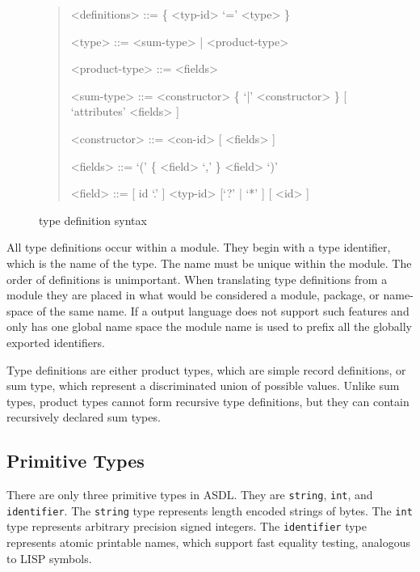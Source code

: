 \begin{figure}[t]
  \begin{quote}
    \begin{grammar}
      <definitions>  ::=  \{ <typ-id> `=' <type> \}

      <type>         ::= <sum-type> | <product-type>

      <product-type> ::= <fields>

      <sum-type>     ::= <constructor> \{ `|' <constructor> \} [ `attributes' <fields> ]

      <constructor>  ::= <con-id> [ <fields> ]

      <fields>       ::= `(' \{ <field>  `,' \} <field> `)'

      <field>        ::= [ id `.' ] <typ-id> [`?' | `*' ]  [ <id> ]
    \end{grammar}
  \end{quote}
  \caption{\asdl{} type definition syntax}
  \label{fig:type-syntax}
\end{figure}%

All type definitions occur within a module.  They begin with a type
identifier, which is the name of the type. The name must be unique within the
module. The order of definitions is unimportant. When translating type
definitions from a module they are placed in what would be considered a
module, package, or name-space of the same name. If a output language does
not support such features and only has one global name space the module name
is used to prefix all the globally exported identifiers.

Type definitions are either product types, which are simple record definitions,
or sum type, which represent a discriminated union of possible values. Unlike
sum types, product types cannot form recursive type definitions, but they can
contain recursively declared sum types.

\subsection{Primitive Types}
There are only three primitive types in ASDL. They
are \lstinline[language=ASDL]!string!, \lstinline[language=ASDL]!int!, and \lstinline[language=ASDL]!identifier!. The \lstinline[language=ASDL]!string! type
represents length encoded strings of bytes. The \lstinline[language=ASDL]!int! type represents
arbitrary precision signed integers. The \lstinline[language=ASDL]!identifier! type represents
atomic printable names, which support fast equality testing, analogous to
LISP symbols.

